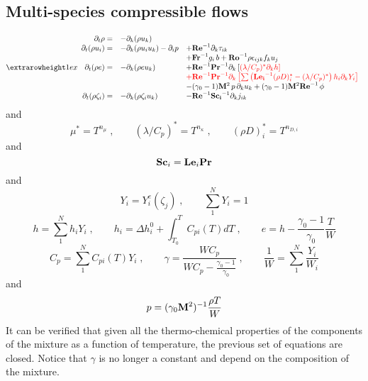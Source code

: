 \subsection{Multi-species compressible flows}

\begin{equation}
\setlength{\extrarowheight}{1ex}
\begin{array}{rll}
  \partial_t \rho =&
  -\partial_k (\rho u_k)  & \\
  \partial_t (\rho u_i) =& 
  -\partial_k (\rho u_i u_k )-\partial_i p  &
  +\mathrm{\bf Re}^{-1}\partial_k \tau_{ik} \\
  & & +\mathrm{\bf Fr}^{-1} g_i\,b+\mathrm{\bf Ro}^{-1}\rho\epsilon_{ijk} f_ku_j  \\
  \partial_t (\rho e) =& 
  -\partial_k (\rho e u_k ) &
  +\mathrm{\bf Re}^{-1}\mathrm{\bf Pr}^{-1} \partial_k \left[\color{red}{(\lambda/C_p)^{*} \partial_k h}\right] \\
  & & \color{red}{+\mathrm{\bf Re}^{-1}\mathrm{\bf Pr}^{-1} \partial_k\left[\sum\left(\mathrm{\bf Le_i}^{-1}(\rho D)_i^*-
  (\lambda/C_p)^*\right)h_i \partial_k Y_i\right]} \\
  & &-(\gamma_0-1)\mathrm{\bf M}^2\,p\, \partial_k u_k  + (\gamma_0-1)\mathrm{\bf M}^2\mathrm{\bf Re}^{-1}\,\phi \\
  \partial_t (\rho \zeta_i)=&
  -\partial_k (\rho \zeta_i u_k) &
  - \mathrm{\bf Re}^{-1}\mathrm{\bf Sc_i}^{-1} \partial_k j_{ik}
\end{array}
\end{equation}
and
\begin{equation}
  \mu^{*} = T^{n_\mu}\;,\qquad (\lambda/C_p)^{*} = T^{n_\kappa} \;,\qquad (\rho
  D)_i^{*} = T^{n_{D,i}}
\end{equation}
and 
\begin{equation}
\mathrm{\bf Sc}_i = \mathrm{\bf Le}_i \mathrm{\bf Pr}
\end{equation}
and 
\begin{equation}
  Y_i = Y^e_i(\zeta_j)\;, \qquad \sum^N_1 Y_i=1 
\end{equation}
\begin{equation}
  h = \sum^N_1 h_{i} Y_i \;,\qquad h_{i} = \Delta h^0_i + \int^{T}_{T_0}
  C_{pi}(T) dT\;,\qquad e = h - \frac{\gamma_0-1}{\gamma_0}\frac{T}{W} 
\end{equation}
\begin{equation}
  C_p = \sum^N_1 C_{pi}(T) Y_i\;,\qquad
  \gamma = \frac{W C_p}{W C_p-\frac{\gamma_0-1}{\gamma_0}} \;,\qquad
  \frac{1}{W} = \sum^N_1 \frac{Y_i}{W_i} 
\end{equation}
and
\begin{equation}
  p = (\gamma_0 \mathrm{\bf M}^2)^{-1} \frac{\rho T}{W} 
\end{equation}
It can be verified that given all the thermo-chemical properties of the
components of the mixture as a function of temperature, the previous set of
equations are closed. Notice that $\gamma$ is no longer a constant and depend on
the composition of the mixture.

